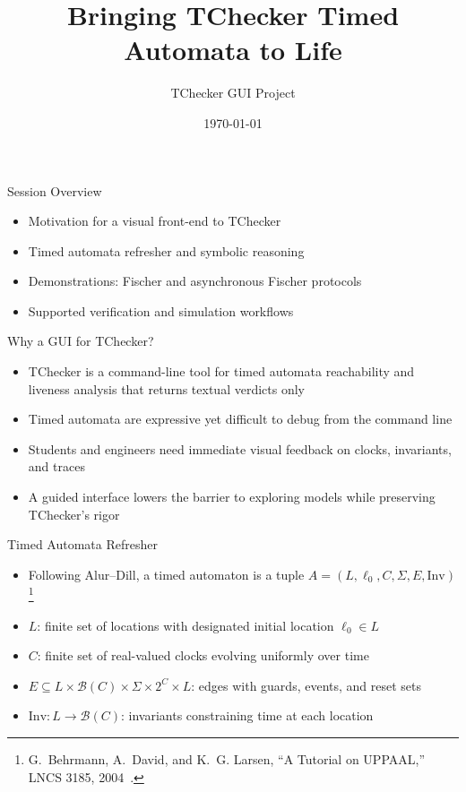 \documentclass{beamer}
\title{Bringing TChecker Timed Automata to Life}
\author{TChecker GUI Project}
\date{\today}
\begin{document}
\begin{frame}
  \titlepage
\end{frame}

\begin{frame}{Session Overview}
  \begin{itemize}
    \item Motivation for a visual front-end to TChecker
    \item Timed automata refresher and symbolic reasoning
    \item Demonstrations: Fischer and asynchronous Fischer protocols
    \item Supported verification and simulation workflows
  \end{itemize}
\end{frame}

\begin{frame}{Why a GUI for TChecker?}
  \begin{itemize}
    \item TChecker is a command-line tool for timed automata reachability and liveness analysis that returns textual verdicts only
    \item Timed automata are expressive yet difficult to debug from the command line
    \item Students and engineers need immediate visual feedback on clocks, invariants, and traces
    \item A guided interface lowers the barrier to exploring models while preserving TChecker's rigor
  \end{itemize}
\end{frame}

\begin{frame}{Timed Automata Refresher}
  \begin{itemize}
    \item Following Alur--Dill, a timed automaton is a tuple \(A = (L, \ell_0, C, \Sigma, E, \mathrm{Inv})\)\footnote{\tiny G.~Behrmann, A.~David, and K.~G. Larsen, ``A Tutorial on UPPAAL,'' LNCS 3185, 2004~\cite{behrmann2004uppaal}.}
    \item \(L\): finite set of locations with designated initial location \(\ell_0 \in L\)
    \item \(C\): finite set of real-valued clocks evolving uniformly over time
    \item \(E \subseteq L \times \mathcal{B}(C) \times \Sigma \times 2^C \times L\): edges with guards, events, and reset sets
    \item \(\mathrm{Inv}: L \rightarrow \mathcal{B}(C)\): invariants constraining time at each location
  \end{itemize}
\end{frame}
\end{document}
